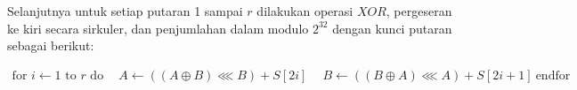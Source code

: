 \documentclass{article}
\begin{document}

Selanjutnya untuk setiap putaran 1 sampai $r$ dilakukan operasi $XOR$, pergeseran ke kiri secara sirkuler, dan penjumlahan dalam modulo $2^{32}$ dengan kunci putaran sebagai berikut:

\begin{align*}
\text{for } i \leftarrow 1 \text{ to } r \text{ do}\
\quad A \leftarrow ((A \oplus B) \lll B) + S[2i]\
\quad B \leftarrow ((B \oplus A) \lll A) + S[2i+1]\
\text{endfor}
\end{align*}
\end{document}
